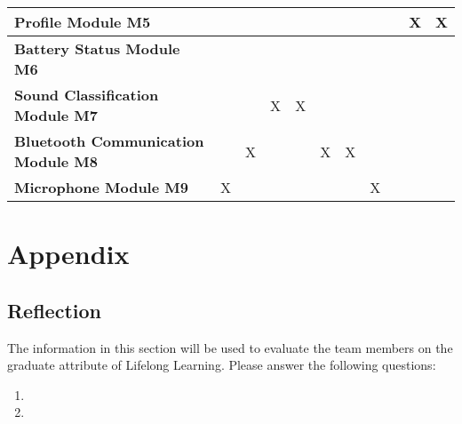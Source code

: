\documentclass[12pt, titlepage]{article}
\begin{document}
\begin{table}[H]
\begin{tabular}{|p{2.5cm}|llllllllll|}
  \textbf{Profile Module M5}                 & \multicolumn{1}{l|}{}            & \multicolumn{1}{l|}{}            & \multicolumn{1}{l|}{}            & \multicolumn{1}{l|}{}            & \multicolumn{1}{l|}{}            & \multicolumn{1}{l|}{}            & \multicolumn{1}{l|}{}             & \multicolumn{1}{l|}{}             & \multicolumn{1}{l|}{X}            & X            \\ \hline
  \textbf{Battery Status Module M6}          & \multicolumn{1}{l|}{}            & \multicolumn{1}{l|}{}            & \multicolumn{1}{l|}{}            & \multicolumn{1}{l|}{}            & \multicolumn{1}{l|}{}            & \multicolumn{1}{l|}{}            & \multicolumn{1}{l|}{}             & \multicolumn{1}{l|}{}             & \multicolumn{1}{l|}{}             &              \\ \hline
  \textbf{Sound Classification Module M7}    & \multicolumn{1}{l|}{}            & \multicolumn{1}{l|}{}            & \multicolumn{1}{l|}{X}           & \multicolumn{1}{l|}{X}           & \multicolumn{1}{l|}{}            & \multicolumn{1}{l|}{}            & \multicolumn{1}{l|}{}             & \multicolumn{1}{l|}{}             & \multicolumn{1}{l|}{}             &              \\ \hline
  \textbf{Bluetooth Communication Module M8} & \multicolumn{1}{l|}{}            & \multicolumn{1}{l|}{X}           & \multicolumn{1}{l|}{}            & \multicolumn{1}{l|}{}            & \multicolumn{1}{l|}{X}           & \multicolumn{1}{l|}{X}           & \multicolumn{1}{l|}{}             & \multicolumn{1}{l|}{}             & \multicolumn{1}{l|}{}             &              \\ \hline
  \textbf{Microphone Module M9}              & \multicolumn{1}{l|}{X}           & \multicolumn{1}{l|}{}            & \multicolumn{1}{l|}{}            & \multicolumn{1}{l|}{}            & \multicolumn{1}{l|}{}            & \multicolumn{1}{l|}{}            & \multicolumn{1}{l|}{X}            & \multicolumn{1}{l|}{}             & \multicolumn{1}{l|}{}             &              \\ \hline
  \end{tabular}
\end{table}

\newpage{}

\section*{Appendix}

\subsection*{Reflection}

The information in this section will be used to evaluate the team members on the
graduate attribute of Lifelong Learning.  Please answer the following questions:

\begin{enumerate}
  \item 
  \item 
\end{enumerate}
\end{document}
